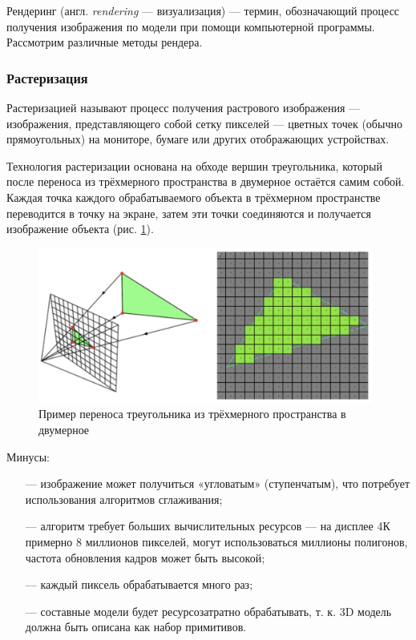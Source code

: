 Рендеринг (англ. \textit{rendering} --- визуализация) --- термин, обозначающий 
процесс получения изображения по модели при помощи компьютерной 
программы. 
Рассмотрим различные методы рендера.

\subsubsection{Растеризация}

Растеризацией \cite{rasterization} называют процесс получения растрового изображения --- 
изображения, представляющего собой сетку пикселей --- цветных точек 
(обычно прямоугольных) на мониторе, бумаге или других отображающих 
устройствах.

Технология растеризации основана на обходе вершин треугольника, 
который после переноса из трёхмерного пространства в двумерное остаётся 
самим собой.
Каждая точка каждого обрабатываемого объекта в трёхмерном 
пространстве переводится в точку на экране, затем эти точки соединяются и 
получается изображение объекта (рис. \ref{fig:rasterization}).

\begin{figure}[h]
	\centering
	\captionsetup{justification=centering}
	\includegraphics[width=110mm]{img/rasterization.png}
	\caption{Пример переноса треугольника из трёхмерного 
		пространства в двумерное}
	\label{fig:rasterization}
\end{figure}

Минусы:
\begin{itemize}[leftmargin=1.6\parindent]
	\item[---] изображение может получиться «угловатым» (ступенчатым), что 
	потребует использования алгоритмов сглаживания;
	\item[---] алгоритм требует больших вычислительных ресурсов --- на дисплее 4К 
	примерно 8 миллионов пикселей, могут использоваться миллионы полигонов, 
	частота обновления кадров может быть высокой;
	\item[---] каждый пиксель обрабатывается много раз;
	\item[---] составные модели будет ресурсозатратно обрабатывать, т. к. 3D модель должна быть описана как набор примитивов.
\end{itemize}

